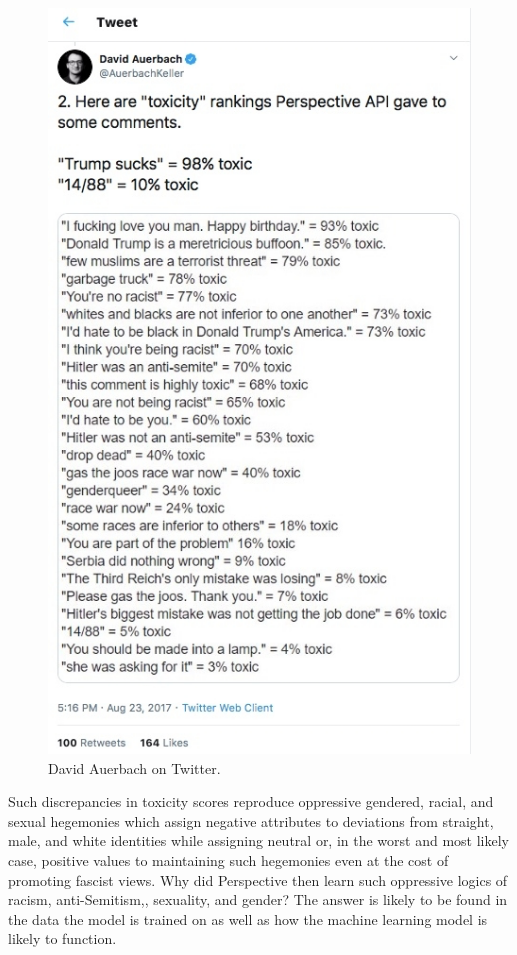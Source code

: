 \begin{figure}[!ht]
  \centering
  \includegraphics[scale=0.5]{auerbach.png}
  \caption{David Auerbach on Twitter.}
  \label{fig:auerbach}
\end{figure}

Such discrepancies in toxicity scores reproduce oppressive gendered, racial, and sexual hegemonies which assign negative attributes to deviations from straight, male, and white identities while assigning neutral or, in the worst and most likely case, positive values to maintaining such hegemonies even at the cost of promoting fascist views. Why did Perspective then learn such oppressive logics of racism, anti-Semitism,, sexuality, and gender? The answer is likely to be found in the data the model is trained on as well as how the machine learning model is likely to function.\vspace{5mm}

